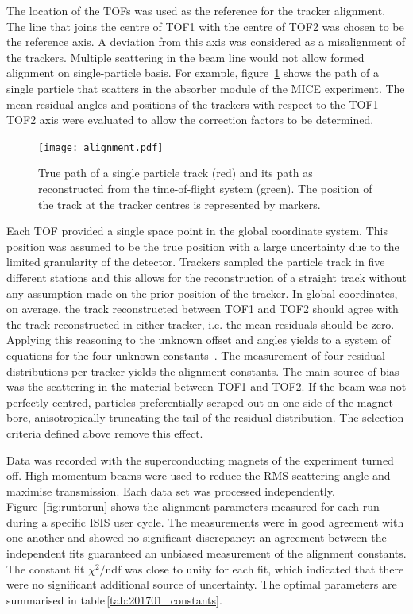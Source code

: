 The location of the TOFs was used as the reference for the tracker alignment. The line that joins the centre of TOF1 with the centre of TOF2 was chosen to be the reference axis. A deviation from this axis was considered as a misalignment of the trackers. Multiple scattering in the beam line would not allow formed alignment on single-particle basis. For example, figure~\ref{fig:align_bl} shows the path of a single particle that scatters in the absorber module of the MICE experiment.
 The mean residual angles and positions of the trackers with respect to the TOF1--TOF2 axis were evaluated to allow the correction factors to be determined.

\begin{figure}
	\begin{center}
		\texttt{[image: alignment.pdf]}
	\end{center}
	\caption{
		True path of a single particle track (red) and its path as reconstructed from the time-of-flight system (green). The position of the track at the tracker centres is represented by markers.
	}
	\label{fig:align_bl}
\end{figure}

Each TOF provided a single space point in the global coordinate system. This position was assumed to be the true position with a large uncertainty due to the limited granularity of the detector.
Trackers sampled the particle track in five different stations and this allows for the reconstruction of a straight track without any assumption made on the prior position of the tracker.
In global coordinates, on average, the track reconstructed between TOF1 and TOF2 should agree with the track reconstructed in either tracker, i.e. the mean residuals should be zero. Applying this reasoning to the unknown offset and angles yields to a system of equations for the four unknown constants~\cite{2018arXiv1805.06623T}.
The measurement of four residual distributions per tracker yields the alignment constants.
The main source of bias was the scattering in the material between TOF1 and TOF2. If the beam was not perfectly centred, particles preferentially scraped out on one side of the magnet bore, anisotropically truncating the tail of the residual distribution. The selection criteria defined above remove this effect.

Data was recorded with the superconducting magnets of the experiment turned off. High momentum beams were used to reduce the RMS scattering angle and maximise transmission.  
Each data set was processed independently. Figure~\ref{fig:runtorun} shows the alignment parameters measured for each run during a specific ISIS user cycle. The measurements were in good agreement with one another and showed no significant discrepancy: an agreement between the independent fits guaranteed an unbiased measurement of the alignment constants. The constant fit $\chi^2/\text{ndf}$ was close to unity for each fit, which indicated that there were no significant additional source of uncertainty. The optimal parameters are summarised in table\,\ref{tab:201701_constants}. 

